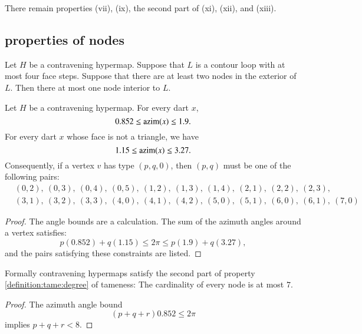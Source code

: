 There remain properties (vii), (ix), the second part of (xi), (xii), and (xiii).







\subsection{properties of nodes}





\begin{lemma}\label{lemma:no-2}
Let $H$ be a contravening hypermap.
Suppose that $L$ is a contour loop with at most four face steps.
Suppose that there are at least two nodes in the exterior of $L$.
Then there at most one node interior to $L$.
\end{lemma}


\begin{lemma} \label{lemma:0.852}
Let $H$ be a contravening
hypermap. For every dart $x$,
    $$0.852\le {\operatorname{azim}}(x)\le 1.9.$$
For every dart $x$ whose face is not a triangle, we have
    $$1.15\le{\operatorname{azim}}(x)\le 3.27.$$
Consequently, if a vertex $v$ has type $(p,q,0)$, then $(p,q)$
must be one of the following pairs:
$$
\begin{array}{lll}
&(0,2),~(0,3),~(0,4),~(0,5),~(1,2),~(1,3),~(1,4),~(2,1),~(2,2),~(2,3),\\
&(3,1),~(3,2),~(3,3),~(4,0),~(4,1),~(4,2),~(5,0),~(5,1),~(6,0),~(6,1),~(7,0)
\end{array}
$$
\end{lemma}
\begin{proof}
The angle bounds are a calculation.  The sum of the azimuth angles
around a vertex satisfies:
$$
  p (0.852) + q (1.15) \le 2\pi \le p (1.9) + q (3.27),
$$
and the pairs satisfying these constraints are listed.
\end{proof}

\begin{lemma} 
Formally contravening hypermaps satisfy the second part of property
\ref{definition:tame:degree} of tameness: The cardinality of every
node is at most $7$.
\end{lemma}

\begin{proof}  The azimuth angle bound
$$
 (p+q+r) 0.852 \le 2\pi
$$
implies $p+q+r < 8$.
\end{proof}




